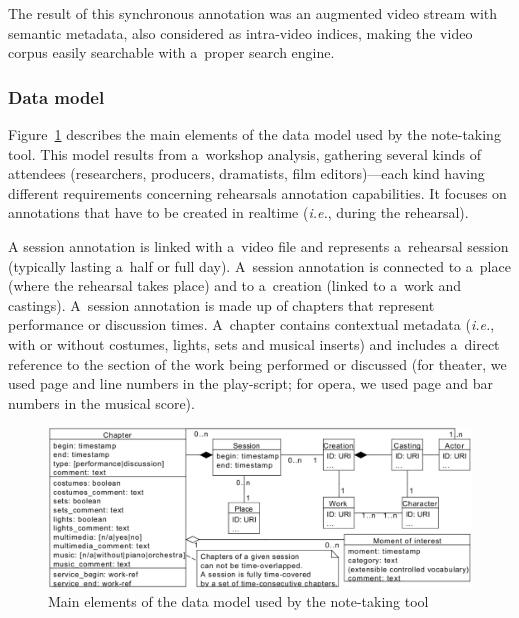 \documentclass[conference]{IEEEtran}
\newcommand{\todo}[1]{\noindent\textcolor{red}{{\bf \{ToDo} #1{\bf \}}}}
\begin{document}
The result of this synchronous annotation was an augmented  video stream with semantic metadata, also considered as intra-video indices, making the video corpus easily searchable with a~proper search engine.

\subsubsection{Data model} Figure~\ref{fig_data_model} describes the main elements of the data model used by the note-taking tool. This model results from a~workshop analysis, gathering several kinds of attendees (researchers, producers, dramatists, film editors)---each kind having different requirements concerning rehearsals annotation capabilities. It focuses on annotations that have to be created in realtime (\emph{i.e.}, during the rehearsal). \newline

A session annotation is linked with a~video file and represents a~rehearsal session (typically lasting a~half or full day). A~session annotation is connected to a~place (where the rehearsal takes place) and to a~creation (linked to a~work and castings). A~session annotation is made up of chapters that represent performance or discussion times. A~chapter contains contextual metadata (\emph{i.e.}, with or without costumes, lights, sets and musical inserts) and includes a~direct reference to the section of the work being performed or discussed (for theater, we used page and line numbers in the play-script; for opera, we used page and bar numbers in the musical score). 



\begin{figure}[ht]
\centering
{
\includegraphics[width=0.95\linewidth]{UMLet_Data_modelvFullPagev3}	
\caption{Main elements of the data model used by the note-taking tool}
\label{fig_data_model}
}
\end{figure}
\end{document}
